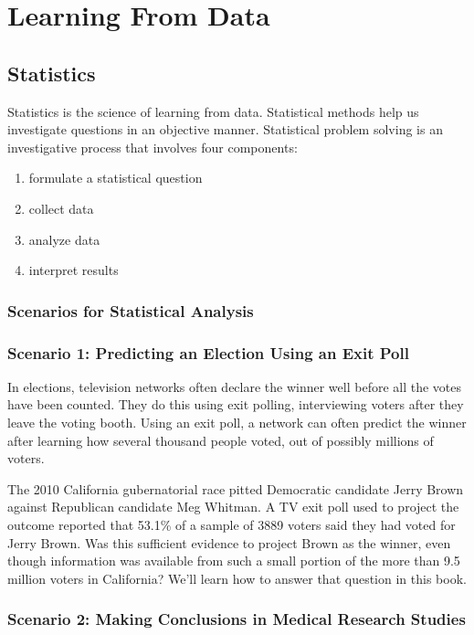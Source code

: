 \chapter{Learning From Data}

\section{Statistics}
Statistics is the science of learning from data. Statistical methods help us investigate questions in an objective manner. Statistical problem solving is an investigative process that involves four components: 

\begin{enumerate}
    \item formulate a statistical question
    \item collect data
    \item analyze data
    \item interpret results
\end{enumerate}

\subsection{Scenarios for Statistical Analysis}

\subsection*{Scenario 1: Predicting an Election Using an Exit Poll}

In elections, television networks often declare the winner well before all the votes have been counted. They do this using exit polling, interviewing voters after they leave the voting booth. Using an exit poll, a network can often predict the winner after learning how several thousand people voted, out of possibly millions of voters.

The 2010 California gubernatorial race pitted Democratic candidate Jerry Brown against Republican candidate Meg Whitman. A TV exit poll used to project the outcome reported that 53.1\% of a sample of 3889 voters said they had voted for Jerry Brown. Was this sufficient evidence to project Brown as the winner, even though information was available from such a small portion of the more than 9.5 million voters in California? We’ll learn how to answer that question in this book.

\subsection*{Scenario 2: Making Conclusions in Medical Research Studies}

